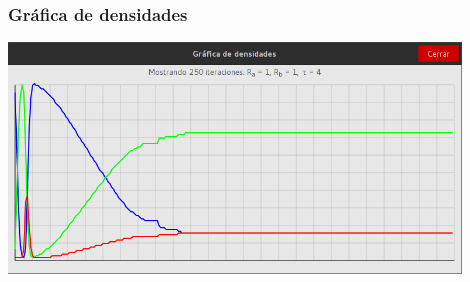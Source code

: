 \documentclass[12pt,letterpaper,oneside]{report}
\begin{document}
	\subsubsection{Gráfica de densidades}
	\begin{center}
		\includegraphics[width=12cm]{img/resistencia/min/g.png}
	\end{center}
\end{document}
